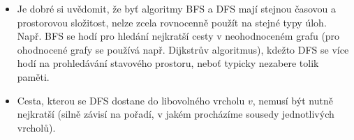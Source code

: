 \begin{remark}
    \begin{itemize}
        \item Je dobré si uvědomit, že byť algoritmy BFS a DFS mají stejnou časovou a prostorovou složitost, nelze zcela rovnocenně použít na stejné typy úloh. Např. BFS se hodí pro hledání nejkratší cesty v neohodnoceném grafu (pro ohodnocené grafy se používá např. Dijkstrův algoritmus), kdežto DFS se více hodí na prohledávání stavového prostoru, neboť typicky nezabere tolik paměti.
        \item Cesta, kterou se DFS dostane do libovolného vrcholu $v$, nemusí být nutně nejkratší (silně závisí na pořadí, v jakém procházíme sousedy jednotlivých vrcholů). 
    \end{itemize}
\end{remark}